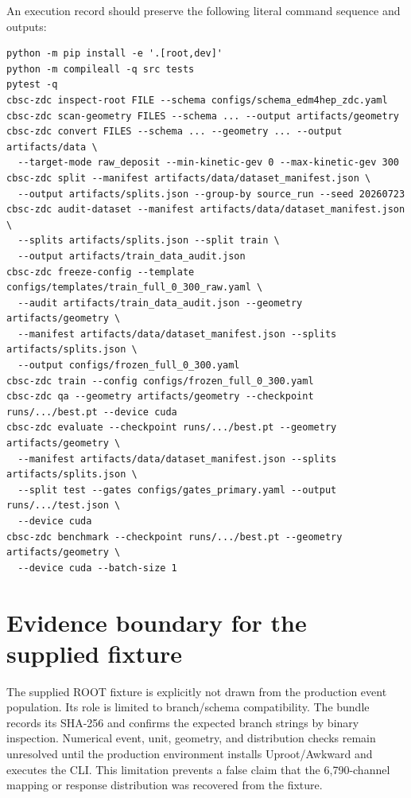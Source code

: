 \documentclass[10pt,a4paper]{article}
\begin{document}
An execution record should preserve the following literal command sequence and outputs:
\begin{lstlisting}
python -m pip install -e '.[root,dev]'
python -m compileall -q src tests
pytest -q
cbsc-zdc inspect-root FILE --schema configs/schema_edm4hep_zdc.yaml
cbsc-zdc scan-geometry FILES --schema ... --output artifacts/geometry
cbsc-zdc convert FILES --schema ... --geometry ... --output artifacts/data \
  --target-mode raw_deposit --min-kinetic-gev 0 --max-kinetic-gev 300
cbsc-zdc split --manifest artifacts/data/dataset_manifest.json \
  --output artifacts/splits.json --group-by source_run --seed 20260723
cbsc-zdc audit-dataset --manifest artifacts/data/dataset_manifest.json \
  --splits artifacts/splits.json --split train \
  --output artifacts/train_data_audit.json
cbsc-zdc freeze-config --template configs/templates/train_full_0_300_raw.yaml \
  --audit artifacts/train_data_audit.json --geometry artifacts/geometry \
  --manifest artifacts/data/dataset_manifest.json --splits artifacts/splits.json \
  --output configs/frozen_full_0_300.yaml
cbsc-zdc train --config configs/frozen_full_0_300.yaml
cbsc-zdc qa --geometry artifacts/geometry --checkpoint runs/.../best.pt --device cuda
cbsc-zdc evaluate --checkpoint runs/.../best.pt --geometry artifacts/geometry \
  --manifest artifacts/data/dataset_manifest.json --splits artifacts/splits.json \
  --split test --gates configs/gates_primary.yaml --output runs/.../test.json \
  --device cuda
cbsc-zdc benchmark --checkpoint runs/.../best.pt --geometry artifacts/geometry \
  --device cuda --batch-size 1
\end{lstlisting}

\section{Evidence boundary for the supplied fixture}

The supplied ROOT fixture is explicitly not drawn from the production event population. Its role is limited to branch/schema compatibility. The bundle records its SHA-256 and confirms the expected branch strings by binary inspection. Numerical event, unit, geometry, and distribution checks remain unresolved until the production environment installs Uproot/Awkward and executes the CLI. This limitation prevents a false claim that the 6,790-channel mapping or response distribution was recovered from the fixture.

\printbibliography
\end{document}
